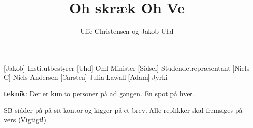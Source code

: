 \documentclass[a4paper]{article}
\title{Oh skræk Oh Ve}
\author{Uffe Christensen og Jakob Uhd}
\begin{document}
\maketitle

\begin{roles}
  [Jakob] Institutbestyrer
  [Uhd] Ond Minister
  [Sidsel] Studendetrepræsentant
  [Niels C] Niels Andersen
  [Carsten] Julia Lawall
  [Adam] Jyrki
\end{roles}

\begin{props}
\end{props}

  \scene \textbf{teknik}: Der er kun to personer på ad gangen. En spot
  på hver.

  \scene SB sidder på på sit kontor og kigger på et brev. Alle
  replikker skal fremsiges på vers (Vigtigt!)
  
\end{document}
